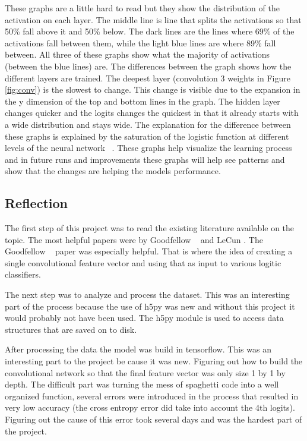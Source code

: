 \documentclass[12pt,twocolumn,letterpaper]{article}
\begin{document}
These graphs are a little hard to read but they show the distribution of the 
activation on each layer. The middle line is line that splits the activations so 
that 50\% fall above it and 50\% below. The dark lines are the lines where 69\% 
of the activations fall between them, while the light blue lines are where 89\% 
fall between. All three of these graphs show what the majority of activations 
(between the blue lines) are. The differences between the graph shows how the 
different layers are trained. The deepest layer (convolution 3 weights in Figure
\ref{fig:conv}) is the slowest to change. This change is visible due to the expansion in the 
y dimension of the top and bottom lines in the graph. The hidden layer changes 
quicker and the logits changes the quickest in that it already starts with a 
wide distribution and stays wide. The explanation for the difference between 
these graphs is explained by the saturation of the logistic function at different 
levels of the neural network ~\cite{xavier}. These graphs help visualize the learning process and 
in future runs and improvements these graphs will help see patterns and show that
the changes are helping the models performance.

\subsection{Reflection}

The first step of this project was to read the existing literature available on 
the topic. The most helpful papers were by Goodfellow \etal ~\cite{goodfellow} and 
LeCun \etal 
\cite{sermanet-icpr-12}. The Goodfellow \etal ~\cite{goodfellow} paper was especially helpful. That 
is where the idea of creating a single convolutional feature vector and using 
that as input to various logitic classifiers.

The next step was to analyze and process the dataset. This was an interesting part 
of the process because the use of h5py was new and without this project it would
probably not have been used. The h5py module is used to access data structures 
that are saved on to disk.

After processing the data the model was build in tensorflow. This was an 
interesting part to the project be cause it was new. Figuring out how to build 
the convolutional network so that the final feature vector was only size 1 by 1 
by depth. The difficult part was turning the mess of spaghetti code into a well 
organized function, several errors were introduced in the process that resulted 
in very low accuracy (the cross entropy error did take into account the 4th 
logits). Figuring out the cause of this error took several days and was the 
hardest part of the project.
\end{document}
